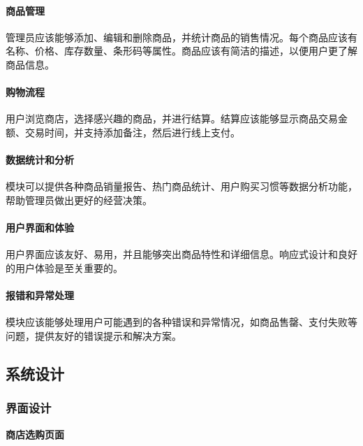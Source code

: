 \documentclass{article}
\begin{document}
\paragraph{商品管理}
管理员应该能够添加、编辑和删除商品，并统计商品的销售情况。每个商品应该有名称、价格、库存数量、条形码等属性。商品应该有简洁的描述，以便用户更了解商品信息。

\paragraph{购物流程}
用户浏览商店，选择感兴趣的商品，并进行结算。结算应该能够显示商品交易金额、交易时间，并支持添加备注，然后进行线上支付。

\paragraph{数据统计和分析}
模块可以提供各种商品销量报告、热门商品统计、用户购买习惯等数据分析功能，帮助管理员做出更好的经营决策。

\paragraph{用户界面和体验}
用户界面应该友好、易用，并且能够突出商品特性和详细信息。响应式设计和良好的用户体验是至关重要的。

\paragraph{报错和异常处理}
模块应该能够处理用户可能遇到的各种错误和异常情况，如商品售罄、支付失败等问题，提供友好的错误提示和解决方案。

\subsection{系统设计}
\subsubsection{界面设计}

\begin{center}
\textbf{商店选购页面}
\end{center}
\end{document}
